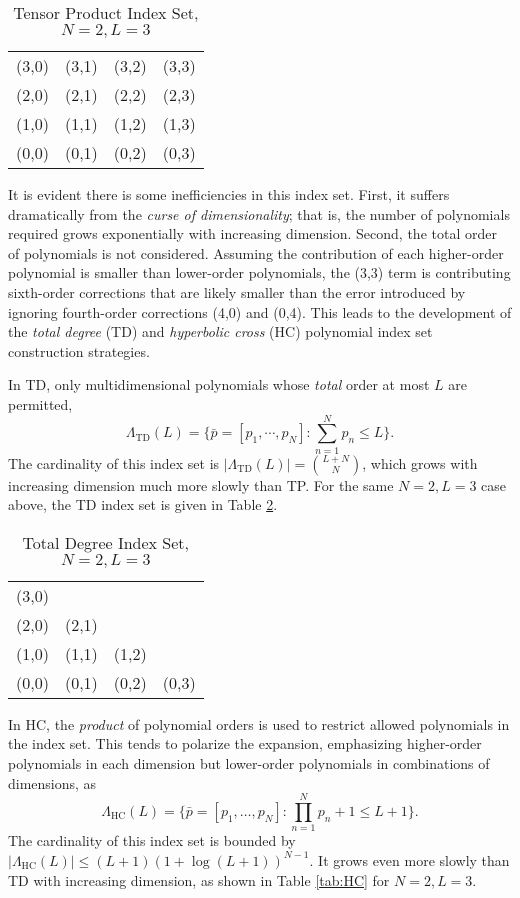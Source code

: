 \begin{table}[h]
  \centering
  \begin{tabular}{c c c c}
    (3,0) & (3,1) & (3,2) & (3,3) \\
    (2,0) & (2,1) & (2,2) & (2,3) \\
    (1,0) & (1,1) & (1,2) & (1,3) \\
    (0,0) & (0,1) & (0,2) & (0,3)
  \end{tabular}
  \caption{Tensor Product Index Set, $N=2,L=3$}
  \label{tab:TP}
\end{table}

It is evident there is some inefficiencies in this index set.  First, it suffers dramatically from the
\emph{curse of dimensionality}; that is, the number of polynomials required grows exponentially with
increasing dimension.  Second, the total order of polynomials is not considered.  Assuming the contribution of
each higher-order polynomial is smaller than lower-order polynomials, the (3,3) term is
contributing sixth-order corrections that are likely smaller than the error introduced by ignoring
fourth-order corrections (4,0) and (0,4).  This leads to the development of the \emph{total degree} (TD) and
\emph{hyperbolic cross} (HC) polynomial index set construction strategies\cite{hctd}.

In TD, only multidimensional polynomials whose \emph{total} order at most $L$ are permitted,
\begin{equation}
  \Lambda_\text{TD}(L)=\Big\{\bar p=[p_1,\cdots,p_N]:\sum_{n=1}^N p_n \leq L
\Big\}.
\end{equation}
The cardinality of this index set is $|\Lambda_\text{TD}(L)|={L+N\choose N}$, which grows with increasing
dimension much more slowly than TP.  For the same $N=2,L=3$ case above, the TD index set is given in Table
\ref{tab:TD}. 

\begin{table}[h]
  \centering
  \begin{tabular}{c c c c}
    (3,0) &       &       &       \\
    (2,0) & (2,1) &       &       \\
    (1,0) & (1,1) & (1,2) &       \\
    (0,0) & (0,1) & (0,2) & (0,3)
  \end{tabular}
  \caption{Total Degree Index Set, $N=2,L=3$}
  \label{tab:TD}
\end{table}

In HC, the \emph{product} of polynomial orders is used to restrict allowed polynomials in the index set.  This
tends to polarize the expansion, emphasizing higher-order polynomials in each dimension but lower-order
polynomials in combinations of dimensions, as
\begin{equation}
  \Lambda_\text{HC}(L)=\Big\{\bar p=[p_1,\ldots,p_N]:\prod_{n=1}^N p_n+1 \leq L+1
\Big\}.
\end{equation}
The cardinality of this index set is bounded by $|\Lambda_\text{HC}(L)|\leq (L+1)(1+\log(L+1))^{N-1}$. It
grows even more slowly than TD with increasing dimension, as shown in Table \ref{tab:HC} for $N=2,L=3$.

